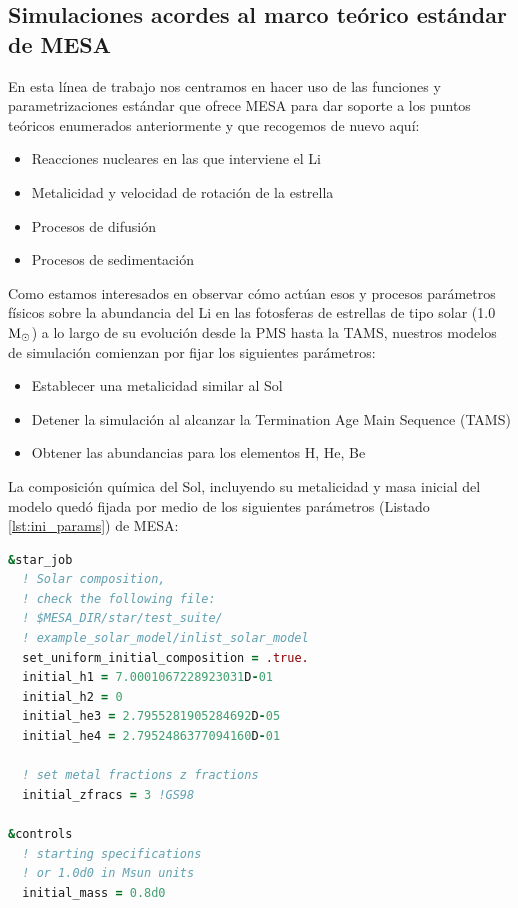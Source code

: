 \subsection{Simulaciones acordes al marco teórico estándar de MESA}
En esta línea de trabajo nos centramos en hacer uso de las funciones y parametrizaciones estándar que ofrece MESA para dar soporte a los puntos teóricos enumerados anteriormente y que recogemos de nuevo aquí:

\begin{itemize}
    \item Reacciones nucleares en las que interviene el Li
    \item Metalicidad y velocidad de rotación de la estrella
    \item Procesos de difusión
    \item Procesos de sedimentación
\end{itemize}

Como estamos interesados en observar cómo actúan esos y procesos parámetros físicos sobre la abundancia del Li en las fotosferas de estrellas de tipo solar (1.0 $\mathrm{M}_\odot$) a lo largo de su evolución desde la PMS hasta la TAMS, nuestros modelos de simulación comienzan por fijar los siguientes parámetros:

\begin{itemize}
    \item Establecer una metalicidad similar al Sol
    \item Detener la simulación al alcanzar la Termination Age Main Sequence (TAMS)
    \item Obtener las abundancias para los elementos H, He, Be
\end{itemize}

La composición química del Sol, incluyendo su metalicidad y masa inicial del modelo quedó fijada por medio de los siguientes parámetros (Listado \ref{lst:ini_params}) de MESA:

\begin{lstlisting}[language=Fortran, caption={Parametrización de la masa inicial de la estrella}, label={lst:ini_params}]
&star_job
  ! Solar composition, 
  ! check the following file:
  ! $MESA_DIR/star/test_suite/
  ! example_solar_model/inlist_solar_model
  set_uniform_initial_composition = .true.
  initial_h1 = 7.0001067228923031D-01
  initial_h2 = 0
  initial_he3 = 2.7955281905284692D-05
  initial_he4 = 2.7952486377094160D-01

  ! set metal fractions z fractions
  initial_zfracs = 3 !GS98

&controls
  ! starting specifications
  ! or 1.0d0 in Msun units
  initial_mass = 0.8d0 
\end{lstlisting}

